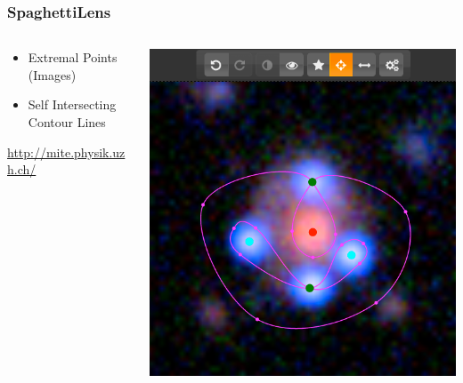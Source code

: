 \documentclass[aspectratio=1610]{beamer}
\begin{document}

 \begin{frame}
   \frametitle{SpaghettiLens}
 
   \begin{columns}[c]
   \begin{column}{0.45\textwidth}
     \begin{itemize}
       \item Extremal Points (Images)
       \item Self Intersecting Contour Lines
     \end{itemize}
     \url{http://mite.physik.uzh.ch/}
 
   \end{column}\begin{column}{0.45\textwidth}
     \includegraphics[width=\textwidth]{imgs/screenshot}
   \end{column}
   \end{columns}
 \end{frame}
\end{document}
